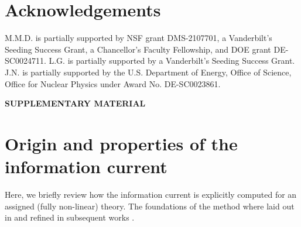 \documentclass[aps,prl,singlecolumn,nofootinbib]{revtex4-2}
\theoremstyle{definition}
\theoremstyle{theorem}
\begin{document}
\section{Acknowledgements}
M.M.D. is partially supported by NSF grant DMS-2107701, a Vanderbilt's Seeding Success Grant, 
a Chancellor's Faculty Fellowship, and DOE grant DE-SC0024711.
L.G. is partially supported by a Vanderbilt's Seeding Success Grant. J.N. is partially supported by the U.S. Department of Energy, Office of Science, Office for Nuclear Physics
under Award No. DE-SC0023861.




\onecolumngrid
\newpage
\begin{center}
{\bf \large SUPPLEMENTARY MATERIAL}
\end{center}

\setcounter{equation}{0}
\setcounter{figure}{0}
\setcounter{table}{0}
\setcounter{page}{1}
\renewcommand{\theequation}{S\arabic{equation}}
\renewcommand{\thefigure}{S\arabic{figure}}



\maketitle


\section{Origin and properties of the information current}\label{sectionI}

Here, we briefly review how the information current is explicitly computed for an assigned (fully non-linear) theory. The foundations of the method where laid out in \cite{GavassinoGibbs2021} and refined in subsequent works \cite{GavassinoCausality2021,
GavassinoStabilityCarter2022,GavassinoGENERIC2022}. 
\end{document}
